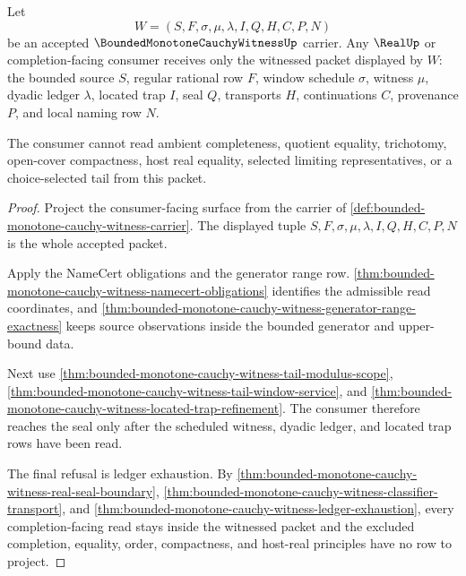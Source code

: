 \begin{theorem}
\label{thm:bounded-monotone-cauchy-witness-completion-consumer-refusal}
Let
$$
W=(S,F,\sigma,\mu,\lambda,I,Q,H,C,P,N)
$$
be an accepted $\BoundedMonotoneCauchyWitnessUp$ carrier. Any $\RealUp$ or completion-facing consumer receives only the witnessed packet displayed by $W$: the bounded source $S$, regular rational row $F$, window schedule $\sigma$, witness $\mu$, dyadic ledger $\lambda$, located trap $I$, seal $Q$, transports $H$, continuations $C$, provenance $P$, and local naming row $N$.

The consumer cannot read ambient completeness, quotient equality, trichotomy, open-cover compactness, host real equality, selected limiting representatives, or a choice-selected tail from this packet.
\end{theorem}
\begin{proof}
Project the consumer-facing surface from the carrier of \autoref{def:bounded-monotone-cauchy-witness-carrier}. The displayed tuple $S,F,\sigma,\mu,\lambda,I,Q,H,C,P,N$ is the whole accepted packet.

Apply the NameCert obligations and the generator range row. \autoref{thm:bounded-monotone-cauchy-witness-namecert-obligations} identifies the admissible read coordinates, and \autoref{thm:bounded-monotone-cauchy-witness-generator-range-exactness} keeps source observations inside the bounded generator and upper-bound data.

Next use \autoref{thm:bounded-monotone-cauchy-witness-tail-modulus-scope}, \autoref{thm:bounded-monotone-cauchy-witness-tail-window-service}, and \autoref{thm:bounded-monotone-cauchy-witness-located-trap-refinement}. The consumer therefore reaches the seal only after the scheduled witness, dyadic ledger, and located trap rows have been read.

The final refusal is ledger exhaustion. By \autoref{thm:bounded-monotone-cauchy-witness-real-seal-boundary}, \autoref{thm:bounded-monotone-cauchy-witness-classifier-transport}, and \autoref{thm:bounded-monotone-cauchy-witness-ledger-exhaustion}, every completion-facing read stays inside the witnessed packet and the excluded completion, equality, order, compactness, and host-real principles have no row to project.
\end{proof}

